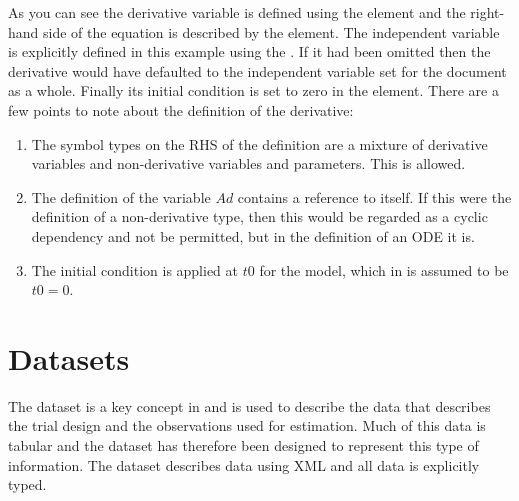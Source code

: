 As you can see the derivative variable is defined using the
 element and the right-hand side of the
equation is described by the  element. The independent
variable is explicitly defined in this example using the
. If it had been omitted then the
derivative would have defaulted to the independent variable set for
the \pharmml document as a whole. Finally its initial condition is
set to zero in the  element. There are a few
points to note about the definition of the derivative:
%
\begin{enumerate}
\item The symbol types on the RHS of the definition are a mixture of
  derivative variables and non-derivative variables and
  parameters. This is allowed.
\item The definition of the variable $Ad$ contains a reference to
  itself. If this were the definition of a non-derivative type, then this
  would be regarded as a cyclic dependency and not be permitted, but
  in the definition of an ODE it is.
\item The initial condition is applied at $t0$ for the model, which in
  \pharmml is assumed to be $t0=0$.
\end{enumerate}
%



\section{Datasets}
\label{sec:dataset}

The dataset is a key concept in \pharmml and is used to describe the data
that describes the trial design and the observations used for
estimation. Much of this data is tabular and the dataset has
therefore been designed to represent this type of information. The
dataset describes data using XML and all data is explicitly typed.


